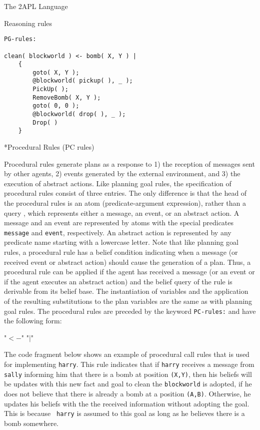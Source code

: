 \begin{chapter}{The 2APL Language}
\begin{section}{Reasoning rules}
\begin{subsection}
\begin{verbatim}
PG-rules:

clean( blockworld ) <- bomb( X, Y ) |
    {
        goto( X, Y );
        @blockworld( pickup( ), _ );
        PickUp( );
        RemoveBomb( X, Y );
        goto( 0, 0 );
        @blockworld( drop( ), _ );
        Drop( )
    }
\end{verbatim}
\end{subsection}

\begin{subsection}*{Procedural Rules (PC rules)}\label{sec:pcrules}

Procedural rules generate plans as a response to 1) the reception of
messages sent by other agents, 2) events generated by the external
environment, and 3) the execution of abstract actions. Like planning
goal rules, the specification of procedural rules consist of three
entries.  The only difference is that the head of the procedural
rules is an atom  (predicate-argument expression), rather
than a query , which represents either a message, an
event, or an abstract action. A message and an event are represented
by atoms with the special predicates {\tt message} and {\tt event},
respectively. An abstract action is represented by any predicate
name starting with a lowercase letter. Note that like planning goal
rules, a procedural rule has a belief condition indicating when a
message (or received event or abstract action) should cause the
generation of a plan. Thus, a procedural rule can be applied if the
agent has received a message (or an event or if the agent executes
an abstract action) and the belief query of the rule is derivable
from its belief base. The instantiation of variables and the
application of the resulting substitutions to the plan variables are
the same as with planning goal rules. The procedural rules are
preceded by the keyword {\tt PC-rules:} and have the following form:

                 "$<-$"  "$|$" 

The code fragment below shows an example of procedural call rules
that is used for implementing {\tt harry}. This rule indicates that
if {\tt harry} receives a message from {\tt sally} informing him
that there is a bomb at position {\tt (X,Y)}, then his beliefs will
be updates with this new fact and goal to clean the {\tt blockworld}
is adopted, if he does not believe that there is already a bomb at a
position {\tt (A,B)}. Otherwise, he updates his beliefs with the the
received information without adopting the goal. This is because {\tt
harry} is assumed to this goal as long as he believes there is a
bomb somewhere.


\end{subsection}
\end{section}
\end{chapter}
